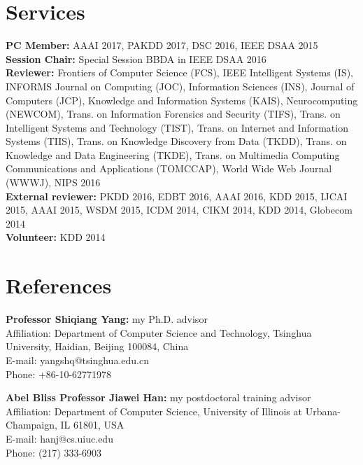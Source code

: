 \documentclass[margin, 10pt]{res}
\begin{document}
\begin{resume}

\section{Services}

\textbf{PC Member:} AAAI 2017, PAKDD 2017, DSC 2016, IEEE DSAA 2015 \\
\textbf{Session Chair:} Special Session BBDA in IEEE DSAA 2016 \\
\textbf{Reviewer:}
Frontiers of Computer Science (FCS),
IEEE Intelligent Systems (IS),
INFORMS Journal on Computing (JOC),
Information Sciences (INS),
Journal of Computers (JCP),
Knowledge and Information Systems (KAIS),
Neurocomputing (NEWCOM),
Trans. on Information Forensics and Security (TIFS),
Trans. on Intelligent Systems and Technology (TIST),
Trans. on Internet and Information Systems (TIIS),
Trans. on Knowledge Discovery from Data (TKDD),
Trans. on Knowledge and Data Engineering (TKDE),
Trans. on Multimedia Computing Communications and Applications (TOMCCAP),
World Wide Web Journal (WWWJ), NIPS 2016 \\
\textbf{External reviewer:} PKDD 2016, EDBT 2016, AAAI 2016, KDD 2015, IJCAI 2015, AAAI 2015,
WSDM 2015, ICDM 2014, CIKM 2014, KDD 2014, Globecom 2014 \\
\textbf{Volunteer:} KDD 2014


\section{References}

\textbf{Professor Shiqiang Yang:} my Ph.D. advisor \\
{Affiliation}: {Department of Computer Science and Technology, Tsinghua University, Haidian, Beijing 100084, China} \\
{E-mail:} {yangshq@tsinghua.edu.cn} \\
{Phone:} {+86-10-62771978}

\textbf{Abel Bliss Professor Jiawei Han:} my postdoctoral training advisor \\
{Affiliation}: {Department of Computer Science, University of Illinois at Urbana-Champaign, IL 61801, USA} \\
{E-mail:} {hanj@cs.uiuc.edu} \\
{Phone:} {(217) 333-6903}


\end{resume}
\end{document}

